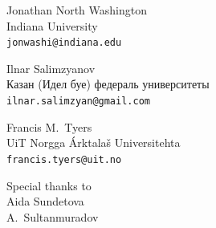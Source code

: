 \documentclass[a0paper,fontscale=0.3]{baposter}  %
\begin{document}
\begin{poster}
{			\vspace{-0.5em}
			\begin{center}
			{\begin{minipage}[t]{11.2em}
				\begin{spacing}{0.4}
					{Jonathan North Washington}\\
					{\footnotesize Indiana University\\\texttt{jonwashi@indiana.edu}}
				\end{spacing}
			\end{minipage}
			\begin{minipage}[t]{10.5em}
				\begin{spacing}{0.4}
					{Ilnar Salimzyanov}\\
					{\footnotesize Казан (Идел буе) федераль университеты \\\texttt{ilnar.salimzyan@gmail.com}}
				\end{spacing}
			\end{minipage}
			\begin{minipage}[t]{8.2em}
				\begin{spacing}{0.4}
					{Francis M.\ Tyers}\\
					{\footnotesize UiT Norgga Árktalaš Universitehta \\\texttt{francis.tyers@uit.no}}
				\end{spacing}
			\end{minipage}}
			\begin{minipage}[t]{5.5em}
				\vspace{-0.25em}
				\begin{spacing}{0.4}
					{\footnotesize Special thanks to}\\
					{\small Aida Sundetova}\\
					{\small A.\ Sultanmuradov}\\
				\end{spacing}
			\end{minipage}
			\end{center}

}
\end{poster}
\end{document}
